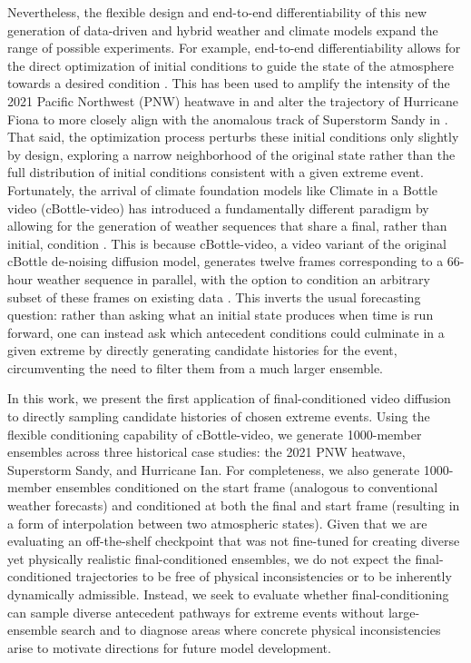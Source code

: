 \documentclass[final]{agujournal2019}
\begin{document}
Nevertheless, the flexible design and end-to-end differentiability of this new generation of data-driven and hybrid weather and climate models expand the range of possible experiments. For example, end-to-end differentiability allows for the direct optimization of initial conditions to guide the state of the atmosphere towards a desired condition \cite{Whittaker2026-fe, Hakim2026-oy}. This has been used to amplify the intensity of the 2021 Pacific Northwest (PNW) heatwave in  and alter the trajectory of Hurricane Fiona to more closely align with the anomalous track of Superstorm Sandy in . That said, the optimization process perturbs these initial conditions only slightly by design, exploring a narrow neighborhood of the original state rather than the full distribution of initial conditions consistent with a given extreme event. Fortunately, the arrival of climate foundation models like Climate in a Bottle video (cBottle-video) has introduced a fundamentally different paradigm by allowing for the generation of weather sequences that share a final, rather than initial, condition \cite{Brenowitz2025-mz}. This is because cBottle-video, a video variant of the original cBottle de-noising diffusion model, generates twelve frames corresponding to a 66-hour weather sequence in parallel, with the option to condition an arbitrary subset of these frames on existing data \cite{Brenowitz2025-mz}. This inverts the usual forecasting question: rather than asking what an initial state produces when time is run forward, one can instead ask which antecedent conditions could culminate in a given extreme by directly generating candidate histories for the event, circumventing the need to filter them from a much larger ensemble.

In this work, we present the first application of final-conditioned video diffusion to directly sampling candidate histories of chosen extreme events. Using the flexible conditioning capability of cBottle-video, we generate 1000-member ensembles across three historical case studies: the 2021 PNW heatwave, Superstorm Sandy, and Hurricane Ian. For completeness, we also generate 1000-member ensembles conditioned on the start frame (analogous to conventional weather forecasts) and conditioned at both the final and start frame (resulting in a form of interpolation between two atmospheric states). Given that we are evaluating an off-the-shelf checkpoint that was not fine-tuned for creating diverse yet physically realistic final-conditioned ensembles, we do not expect the final-conditioned trajectories to be free of physical inconsistencies or to be inherently dynamically admissible. Instead, we seek to evaluate whether final-conditioning can sample diverse antecedent pathways for extreme events without large-ensemble search and to diagnose areas where concrete physical inconsistencies arise to motivate directions for future model development.
\end{document}
